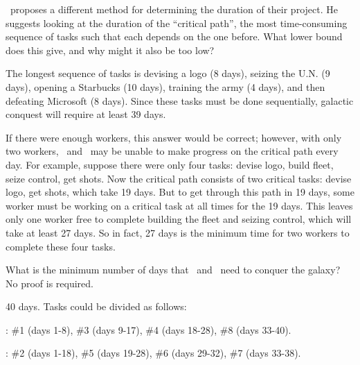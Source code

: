 \begin{problem}
\ppart \Jay\  proposes a different method for determining the
duration of their project.  He suggests looking at the duration of
the ``critical path'', the most time-consuming sequence of tasks
such that each depends on the one before.  What lower bound does this
give, and why might it also be too low?

\begin{solution}
The longest sequence of tasks is devising a logo (8 days),
seizing the U.N. (9 days), opening a Starbucks (10 days), training
the army (4 days), and then defeating Microsoft (8 days).  Since these
tasks must be done sequentially, galactic conquest will require at
least 39 days.

If there were enough workers, this answer would be correct; however, with
only two workers, \Jay\  and \Rongrong\  may be unable to make progress on the
critical path every day.  For example, suppose there were only four
tasks: devise logo, build fleet, seize control, get shots.  Now the
critical path consists of two critical tasks: devise logo, get shots,
which take 19 days.  But to get through this path in 19 days, some worker
must be working on a critical task at all times for the 19 days.  This
leaves only one worker free to complete building the fleet and seizing
control, which will take at least 27 days.  So in fact, 27 days is the
minimum time for two workers to complete these four tasks.
\end{solution}

\ppart What is the minimum number of days that \Jay\  and \Rongrong\ 
need to conquer the galaxy?  No proof is required.

\begin{solution}
40 days.  Tasks could be divided as follows:

\Rongrong: \#1 (days 1-8), \#3 (days 9-17), \#4 (days 18-28), \#8 (days
33-40).

\Jay: \#2 (days 1-18), \#5 (days 19-28), \#6 (days 29-32), \#7 (days
33-38).  

\end{solution}
\eparts
\end{problem} 


\endinput
